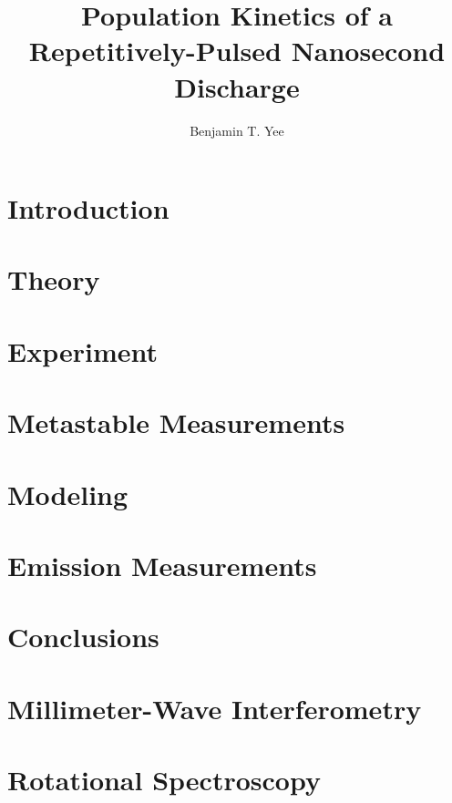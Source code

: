 \documentclass[12pt]{./tex/thesis-umich}
\title{Population Kinetics of a Repetitively-Pulsed Nanosecond Discharge}
\author{Benjamin T. Yee}
\begin{document}
  \chapter{Introduction}\label{chp:introduction}
    
  
  \chapter{Theory}\label{chp:theory}
    

  \chapter{Experiment}\label{chp:experiment}
    

  \chapter{Metastable Measurements}\label{chp:metastables}
    
  
  \chapter{Modeling}\label{chp:modeling}

  \chapter{Emission Measurements}\label{chp:emissions}

  \chapter{Conclusions}\label{chp:conclusions}

  \appendix
    \chapter{Millimeter-Wave Interferometry}\label{chp:mmw}
      
    \chapter{Rotational Spectroscopy}\label{chp:oes}
      

  
  
\end{document}
